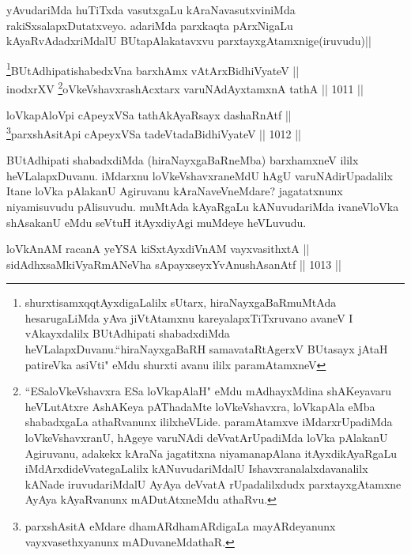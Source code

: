 \begin{artha}
yAvudariMda huTiTxda vasutxgaLu kAraNavasutxviniMda rakiSxsalapxDutatxveyo. adariMda parxkaqta pArxNigaLu kAyaRvAdadxriMdalU BUtapAlakatavxvu parxtayxgAtamxnige(iruvudu)||
\end{artha}

\begin{shl}
\footnote{shurxtisamxqqtAyxdigaLalilx sUtarx, hiraNayxgaBaRmuMtAda hesarugaLiMda yAva jiVtAtamxnu kareyalapxTiTxruvano avaneV I vAkayxdalilx BUtAdhipati shabadxdiMda heVLalapxDuvanu.``hiraNayxgaBaRH samavataRtAgerxV BUtasayx jAtaH patireVka asiVti" eMdu shurxti avanu ililx paramAtamxneV}BUtAdhipatishabedxVna barxhAmx vA\s tArxBidhiVyateV || \\
inodxrXV \footnote{``ESaloVkeVshavxra ESa loVkapAlaH" eMdu mAdhayxMdina shAKeyavaru heVLutAtxre AshAKeya pAThadaMte loVkeVshavxra, loVkapAla eMba shabadxgaLa athaRvanunx ililxheVLide. paramAtamxve iMdarxrUpadiMda loVkeVshavxranU, hAgeye varuNAdi deVvatArUpadiMda loVka pAlakanU Agiruvanu, adakekx kAraNa jagatitxna niyamanapAlana itAyxdikAyaRgaLu iMdArxdideVvategaLalilx kANuvudariMdalU Ishavxranalalxdavanalilx kANade iruvudariMdalU AyAya deVvatA rUpadalilxdudx parxtayxgAtamxne AyAya kAyaRvanunx mADutAtxneMdu athaRvu.}oVkeVshavxrashAcxtarx varuNAdAyxtamxnA tathA \hfill || 1011 ||  
\end{shl}
				
\begin{shl}
loVkapAloV\s pi cApeyxVSa tathAkAyaRsayx dashaRnAtf || \\
\footnote{parxshAsitA eMdare dhamARdhamARdigaLa mayARdeyanunx vayxvasethxyanunx mADuvaneMdathaR.}parxshAsitA\s pi cApeyxVSa tadeVtadaBidhiVyateV \hfill || 1012 ||  
\end{shl}


\begin{artha}
BUtAdhipati shabadxdiMda (hiraNayxgaBaRneMba) barxhamxneV ililx heVLalapxDuvanu. iMdarxnu loVkeVshavxraneMdU hAgU varuNAdirUpadalilx Itane loVka pAlakanU Agiruvanu kAraNaveVneMdare? jagatatxnunx niyamisuvudu pAlisuvudu. muMtAda kAyaRgaLu kANuvudariMda ivaneVloVka shAsakanU eMdu seVtuH itAyxdiyAgi muMdeye heVLuvudu.
\end{artha}


\begin{shl}
loVkAnAM racanA yeYSA kiSxtAyxdiVnAM vayxvasithxtA || \\
sidAdhx\s saMkiVyaRmANeVha sA\s payxseyxYvAnushAsanAtf \hfill || 1013 ||  
\end{shl}

